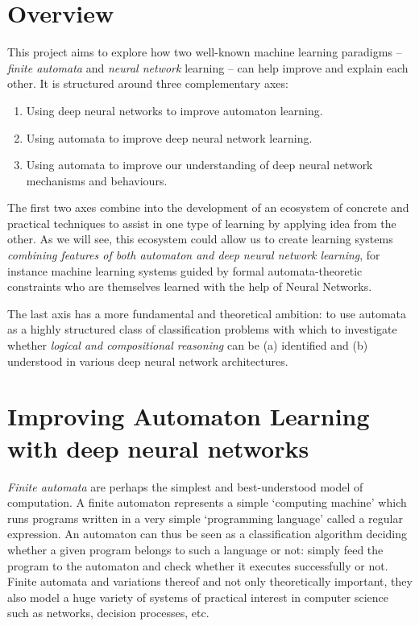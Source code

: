 \documentclass[11pt,a4paper]{article}
\begin{document}
	
	
	\section{Overview}
	This project aims to explore how two well-known machine learning paradigms -- \emph{finite automata} and \emph{neural network} learning -- can help improve and explain each other.
	It is structured around  three complementary axes:
	\begin{enumerate}
		\item Using deep neural networks to improve automaton learning.
		\item Using automata to improve deep neural network learning.
		\item Using automata to improve our understanding of deep neural network mechanisms and behaviours.
	\end{enumerate}
	The first two axes combine into the development of an ecosystem of concrete and practical techniques to assist in one type of learning by applying idea from the other. 
	As we will see, this ecosystem could allow us to create learning systems \emph{combining features of both automaton and deep neural network learning}, for instance machine learning systems guided by formal automata-theoretic constraints who are themselves learned with the help of Neural Networks. 
	
	The last axis has a more fundamental and theoretical ambition: to use automata as a highly structured class of classification problems with which to investigate whether \emph{logical and compositional reasoning} can be (a) identified and (b) understood in various deep neural network architectures.
	
	\section{Improving Automaton Learning with deep neural networks}
	\emph{Finite automata} are perhaps the simplest and best-understood model of computation. A finite automaton represents a simple `computing machine' which runs programs written in a very simple `programming language' called a regular expression. An automaton can thus be seen as a classification algorithm deciding whether a given program belongs to such a language or not: simply feed the program to the automaton and check whether it executes successfully or not. Finite automata and variations thereof and not only theoretically important, they also model a huge variety of systems of practical interest in computer science such as networks, decision processes, etc.
	
\end{document}
